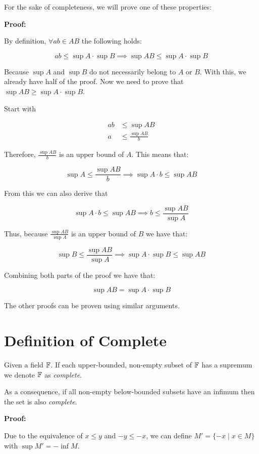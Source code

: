 For the sake of completeness, we will prove one of these properties:

\textbf{Proof:}

By definition, \(\forall ab \in AB\) the following holds:

\[
	ab \le \sup A \cdot \sup B \implies \sup AB \le \sup A \cdot \sup B
\]

Because \(\sup A\) and \(\sup B\) do not necessarily belong to \(A\) or \(B\). With this, we already have
half of the proof. Now we need to prove that \(\sup AB \ge \sup A \cdot \sup B\).

Start with

\begin{align*}
	ab & \le \sup AB           \\
	a  & \le \frac{\sup AB}{b}
\end{align*}

Therefore, \(\frac{\sup AB}{b}\) is an upper bound of \(A\). This means that:

\[
	\sup A \le \frac{\sup AB}{b} \implies \sup A \cdot b \le \sup AB
\]

From this we can also derive that

\[
	\sup A \cdot b \le \sup AB \implies b \le \frac{\sup AB}{\sup A}
\]

Thus, because \(\frac{\sup AB}{\sup A}\) is an upper bound of \(B\) we have that:

\[
	\sup B \le \frac{\sup AB}{\sup A} \implies \sup A \cdot \sup B \le \sup AB
\]

Combining both parts of the proof we have that:

\[
	\sup AB = \sup A \cdot \sup B
\]

\QED

The other proofs can be proven using similar arguments.

\section{Definition of Complete}

Given a field \(\mathbb{F}\). If each upper-bounded, non-empty subset of \(\mathbb{F}\) has a supremum we denote \(\mathbb{F}\) as
\emph{complete}.

As a consequence, if all non-empty below-bounded subsets have an infimum then the set is also \emph{complete}.

\textbf{Proof:}

Due to the equivalence of \(x \le y\) and \(-y \le -x\), we can define \(M' = \{-x \mid x \in M\}\) with \(\sup M' = - \inf M\).

